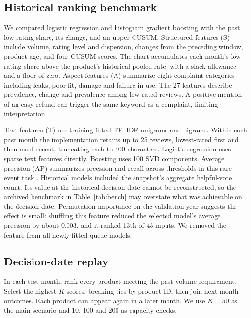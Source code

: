 \documentclass[conference]{IEEEtran}
\begin{document}
\subsection{Historical ranking benchmark}
We compared logistic regression and histogram gradient boosting \cite{friedman} with the past low-rating share, its change, and an upper CUSUM. Structured features (S) include volume, rating level and dispersion, changes from the preceding window, product age, and four CUSUM scores. The chart accumulates each month's low-rating share above the product's historical pooled rate, with a slack allowance and a floor of zero. Aspect features (A) summarize eight complaint categories including leaks, poor fit, damage and failure in use. The 27 features describe prevalence, change and prevalence among low-rated reviews. A positive mention of an easy refund can trigger the same keyword as a complaint, limiting interpretation.

Text features (T) use training-fitted TF--IDF unigrams and bigrams. Within each past month the implementation retains up to 25 reviews, lowest-rated first and then most recent, truncating each to 400 characters. Logistic regression uses sparse text features directly. Boosting uses 100 SVD components. Average precision (AP) summarizes precision and recall across thresholds in this rare-event task \cite{saito}. Historical models included the snapshot's aggregate helpful-vote count. Its value at the historical decision date cannot be reconstructed, so the archived benchmark in Table~\ref{tab:bench} may overstate what was achievable on the decision date. Permutation importance on the validation year suggests the effect is small: shuffling this feature reduced the selected model's average precision by about 0.003, and it ranked 13th of 43 inputs. We removed the feature from all newly fitted queue models.

\subsection{Decision-date replay}
In each test month, rank every product meeting the past-volume requirement. Select the highest $K$ scores, breaking ties by product ID, then join next-month outcomes. Each product can appear again in a later month. We use $K=50$ as the main scenario and 10, 100 and 200 as capacity checks.
\end{document}
